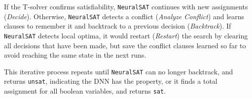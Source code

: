 \documentclass[oneside,11pt,dvipsnames]{book}
\numberwithin{equation}{section}
\theoremstyle{definition}
\theoremstyle{remark}
\newcommand{\neuralsat}{\texttt{NeuralSAT}}
\newcommand{\sat}{\texttt{sat}}
\newcommand{\unsat}{\texttt{unsat}}
\begin{document}
If the T-solver confirms satisfiability, \neuralsat{} continues with new assignments (\emph{Decide}). Otherwise, \neuralsat{} detects a conflict   (\emph{Analyze Conflict}) and learns clauses to remember it and backtrack to a previous decision  (\emph{Backtrack}).
If \neuralsat{} detects local optima, it would restart (\emph{Restart}) the search by clearing all decisions that have been made, but save the conflict clauses learned so far to avoid reaching the same state in the next runs.

This iterative process repeats until \neuralsat{} can no longer backtrack, and returns \unsat{}, indicating the DNN has the property, or it finds a total assignment for all boolean variables, and returns \sat{}. %
\end{document}
